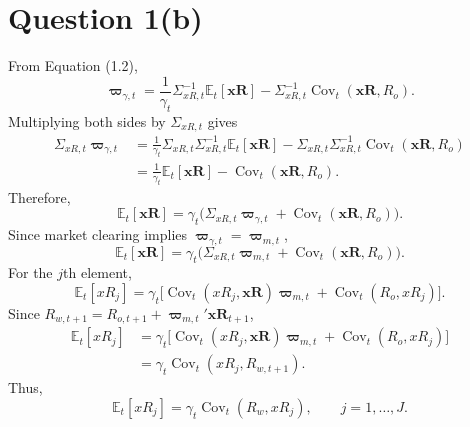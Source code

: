 \documentclass[11pt]{article}
\newcommand{\Et}{\mathbb{E}_t}
\newcommand{\Ct}{\operatorname{Cov}_t}
\newcommand{\xr}{\mathbf{xR}_{t+1}}
\begin{document}
\section*{Question 1(b)}
From Equation (1.2),
\[
\boldsymbol\varpi_{\gamma,t}
=\frac1{\gamma_t}\Sigma_{xR,t}^{-1}\Et[\mathbf{xR}]
-\Sigma_{xR,t}^{-1}\Ct(\mathbf{xR},R_o).
\]
Multiplying both sides by $\Sigma_{xR,t}$ gives
\begin{align*}
\Sigma_{xR,t}\boldsymbol\varpi_{\gamma,t}
&=\frac1{\gamma_t}\Sigma_{xR,t}\Sigma_{xR,t}^{-1}\Et[\mathbf{xR}]
-\Sigma_{xR,t}\Sigma_{xR,t}^{-1}\Ct(\mathbf{xR},R_o)\\
&=\frac1{\gamma_t}\Et[\mathbf{xR}]-\Ct(\mathbf{xR},R_o).
\end{align*}
Therefore,
\[
\Et[\mathbf{xR}]=\gamma_t\bigl(
\Sigma_{xR,t}\boldsymbol\varpi_{\gamma,t}+\Ct(\mathbf{xR},R_o)\bigr).
\]
Since market clearing implies
$\boldsymbol\varpi_{\gamma,t}=\boldsymbol\varpi_{m,t}$,
\[
\Et[\mathbf{xR}]=\gamma_t\bigl(
\Sigma_{xR,t}\boldsymbol\varpi_{m,t}+\Ct(\mathbf{xR},R_o)\bigr).
\]
For the $j$th element,
\[
\Et[xR_j]=\gamma_t\bigl[
\Ct(xR_j,\mathbf{xR})\boldsymbol\varpi_{m,t}+\Ct(R_o,xR_j)\bigr].
\]
Since $R_{w,t+1}=R_{o,t+1}+\boldsymbol\varpi_{m,t}'\xr$,
\begin{align*}
\Et[xR_j]
&=\gamma_t\bigl[\Ct(xR_j,\mathbf{xR})\boldsymbol\varpi_{m,t}
+\Ct(R_o,xR_j)\bigr]\\
&=\gamma_t\Ct(xR_j,R_{w,t+1}).
\end{align*}
Thus,
\[
\boxed{\Et[xR_j]=\gamma_t\Ct(R_w,xR_j),\qquad j=1,\ldots,J.}
\]
\end{document}
